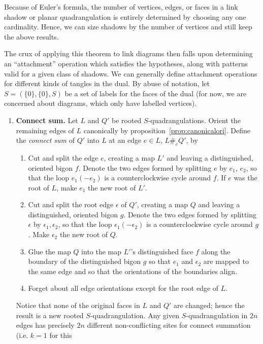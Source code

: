 \documentclass[amsmath,longbibliography,secnumarabic,floatfix,amssymb,nofootinbib,nobibnotes,letterpaper,11pt,notitlepage,tightenlines]{revtex4-1}
\begin{document}
Because of Euler's formula, the number of vertices, edges, or faces in a link shadow or planar
quadrangulation is entirely determined by choosing any one cardinality. Hence, we can size shadows
by the number of vertices and still keep the above results.

The crux of applying this theorem to link diagrams then falls upon
determining an ``attachment'' operation which satisfies the
hypotheses, along with patterns valid for a given class of shadows.
We can generally define attachment operations for different kinds of
tangles in the dual. By abuse of notation, let $S = (\{0\}, \{0\}, S)$ be a set of
labels for the faces of the dual (for now, we are concerned about
diagrams, which only have labelled vertices).
\begin{enumerate}
\item \textbf{Connect sum.} Let $L$ and $Q'$ be rooted $S$-quadrangulations. Orient the
  remaining edges of $L$ canonically by proposition~\ref{prop:canonicalori}. Define the
  \emph{connect sum} of $Q'$ into $L$ at an edge $e \in L$, $L \#_e Q'$, by
  \begin{enumerate}
  \item Cut and split the edge $e$, creating a map $L'$ and leaving a distinguished, oriented bigon
    $f$. Denote the two edges formed by splitting $e$ by $e_1$, $e_2$, so that the loop $e_1(-e_2)$
    is a counterclockwise cycle around $f$. If $e$ was the root of $L$, make $e_1$ the new root of
    $L'$.
  \item Cut and split the root edge $\epsilon$ of $Q'$, creating a map $Q$ and leaving a
    distinguished, oriented bigon $g$. Denote the two edges formed by splitting $\epsilon$ by
    $\epsilon_1, \epsilon_2$, so that the loop $\epsilon_1(-\epsilon_2)$ is a counterclockwise cycle
    around $g$. Make $\epsilon_2$ the new root of $Q$.
  \item Glue the map $Q$ into the map $L'$'s distinguished face $f$ along the boundary of the
    distinguished bigon $g$ so that $e_1$ and $\epsilon_2$ are mapped to the same edge and so that
    the orientations of the boundaries align.
  \item Forget about all edge orientations except for the root edge of $L$.
  \end{enumerate} Notice that none of the original faces in $L$ and $Q'$ are changed; hence the
  result is a new rooted $S$-quadrangulation. Any given $S$-quadrangulation in $2n$ edges
  has precisely $2n$ different non-conflicting sites for connect summation (i.e. $k = 1$ for this

\end{enumerate}
\end{document}
